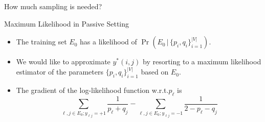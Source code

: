 \documentclass[10pt,svgnames,ignorenonframetext,final]{beamer}
\providecommand{\largelist}{%
  \setlength{\itemsep}{8pt}\setlength{\parskip}{3pt}}
\begin{document}
\begin{frame}{How much sampling is needed?}



\end{frame}

\begin{frame}{Maximum Likelihood in Passive Setting}

  \begin{itemize}[<+->]
    \largelist
  \item
    The training set \(E_0\) has a likelihood of $\Pr\left(E_0\,|\, \{p_i, q_i\}_{i=1}^{|V|}\right)$.

  \item
    We would like to \alert{approximate \(y^*(i,j)\)} by resorting to a maximum
    likelihood estimator of the parameters \(\{p_i, q_i\}_{i=1}^{|V|}\)
    based on \(E_0\).

  \item 
    The gradient of the log-likelihood function w.r.t.\@ $p_\ell$ is
    \begin{equation*}
      \sum_{\ell,j\in E_0; y_{\ell j}=+1} \frac{1}{p_\ell+q_j} -
      \sum_{\ell,j\in E_0; y_{\ell j}=-1} \frac{1}{2-p_\ell-q_j}
    \end{equation*}
\end{itemize}

\end{frame}
\end{document}
